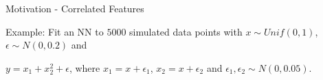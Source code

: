 \documentclass[10pt,compress,t,notes=noshow, xcolor=table]{beamer}
\begin{document}
\begin{frame}{Motivation - Correlated Features}


Example: Fit an NN to $5000$ simulated data points with $x \sim Unif(0,1)$, $\epsilon \sim N(0, 0.2)$ and

\centerline{$y = x_1 + x_2^2 + \epsilon$, where
$x_1 = x + \epsilon_1$, 
$x_2 = x + \epsilon_2$ and $\epsilon_1, \epsilon_2 \sim N(0, 0.05)$.}

\begin{columns}[T, totalwidth=\textwidth]
\begin{column}{0.6\textwidth}
\centering
{}
\end{column}
\begin{column}{0.4\textwidth}


\end{column}
\end{columns}
\end{frame}
\end{document}
